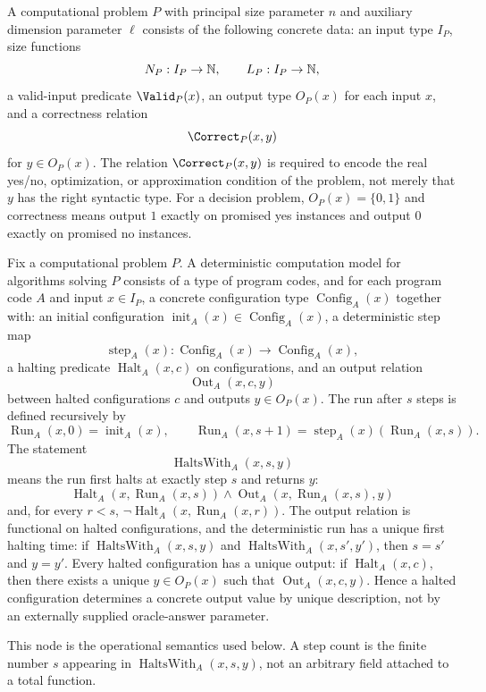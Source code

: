 \begin{definition}
  \label{def:computational-problem-spec}
  A computational problem $P$ with principal size parameter $n$ and auxiliary
  dimension parameter $\ell$ consists of the following concrete data:
  an input type $I_P$, size functions
  \[
    N_P:I_P\to\mathbb{N},\qquad L_P:I_P\to\mathbb{N},
  \]
  a valid-input predicate $\Valid_P(x)$, an output type $O_P(x)$ for each
  input $x$, and a correctness relation
  \[
    \Correct_P(x,y)
  \]
  for $y\in O_P(x)$.  The relation $\Correct_P(x,y)$ is required to encode the
  real yes/no, optimization, or approximation condition of the problem, not
  merely that $y$ has the right syntactic type.  For a decision problem,
  $O_P(x)=\{0,1\}$ and correctness means output $1$ exactly on promised yes
  instances and output $0$ exactly on promised no instances.
\end{definition}

\begin{definition}
  \label{def:deterministic-operational-semantics}
  Fix a computational problem $P$.  A deterministic computation model for
  algorithms solving $P$ consists of a type of program codes, and for each
  program code $A$ and input $x\in I_P$, a concrete configuration type
  $\operatorname{Config}_A(x)$ together with:
  an initial configuration
  $\operatorname{init}_A(x)\in\operatorname{Config}_A(x)$, a deterministic step
  map
  \[
    \operatorname{step}_A(x):
      \operatorname{Config}_A(x)\to\operatorname{Config}_A(x),
  \]
  a halting predicate $\operatorname{Halt}_A(x,c)$ on configurations, and an
  output relation
  \[
    \operatorname{Out}_A(x,c,y)
  \]
  between halted configurations $c$ and outputs $y\in O_P(x)$.  The run after
  $s$ steps is defined recursively by
  \[
    \operatorname{Run}_A(x,0)=\operatorname{init}_A(x),\qquad
    \operatorname{Run}_A(x,s+1)=
      \operatorname{step}_A(x)(\operatorname{Run}_A(x,s)).
  \]
  The statement
  \[
    \operatorname{HaltsWith}_A(x,s,y)
  \]
  means the run first halts at exactly step $s$ and returns $y$:
  \[
    \operatorname{Halt}_A(x,\operatorname{Run}_A(x,s))\wedge
    \operatorname{Out}_A(x,\operatorname{Run}_A(x,s),y)
  \]
  and, for every $r<s$,
  $\neg\operatorname{Halt}_A(x,\operatorname{Run}_A(x,r))$.  The output
  relation is functional on halted configurations, and the deterministic run
  has a unique first halting time:
  if $\operatorname{HaltsWith}_A(x,s,y)$ and
  $\operatorname{HaltsWith}_A(x,s',y')$, then
  $s=s'$ and $y=y'$.
  Every halted configuration has a unique output: if
  $\operatorname{Halt}_A(x,c)$, then there exists a unique
  $y\in O_P(x)$ such that $\operatorname{Out}_A(x,c,y)$.  Hence a halted
  configuration determines a concrete output value by unique description, not
  by an externally supplied oracle-answer parameter.

  This node is the operational semantics used below.  A step count is the
  finite number $s$ appearing in
  $\operatorname{HaltsWith}_A(x,s,y)$, not an arbitrary field attached to a
  total function.
\end{definition}

